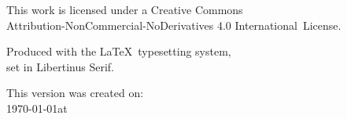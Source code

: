 {	This work is licensed under a Creative Commons\\
	Attribution-NonCommercial-NoDerivatives 4.0 International~License.

	Produced with the \LaTeX\ typesetting system,\\
	set in Libertinus Serif.

	\ifafiveversion  \vspace{0.5cm} \fi
	\ifninebythirteenversion \vspace{0.25cm} \fi

	\ifdigitalversion
		This version was created on:\\
		\today \space at \currenttime\\
	\fi

	\ifafiveversion \vspace{0.5cm} \fi
	\ifninebythirteenversion \vspace{0.15cm} \fi

	\theEditionInfo

}

